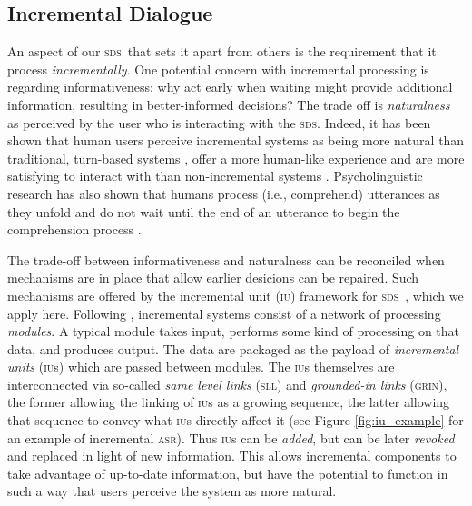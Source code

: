 \documentclass[11pt]{article}
\newcommand{\sds}[0]{\textsc{sds}}
\newcommand{\asr}[0]{\textsc{asr}}
\newcommand{\iu}[0]{\textsc{iu}}
\begin{document}
\subsection{Incremental Dialogue}

An aspect of our \sds\ that sets it apart from others is the requirement that it process \emph{incrementally}. One potential concern with incremental processing is regarding informativeness: why act early when waiting might provide additional information, resulting in better-informed decisions? 
The trade off is \emph{naturalness} as perceived by the user who is interacting with the \sds. Indeed, it has been shown that human users perceive incremental systems as being more natural than traditional, turn-based systems \cite{Aist2006,Skantze2009,skantze2010sigdial,Asri2014}, offer a more human-like experience  \cite{Edlund2008b} and are more satisfying to interact with than non-incremental systems \cite{Aistetal:incrunder-short}. Psycholinguistic research has also shown that humans process (i.e., comprehend) utterances as they unfold and do not wait until the end of an utterance to begin the comprehension process \cite{Tanenhaus1995,Spivey_2002tw}. 

The trade-off between informativeness and naturalness can be reconciled when mechanisms are in place that allow earlier desicions can be repaired. Such mechanisms are offered by the incremental unit (\iu) framework for \sds\ \cite{Schlangen2011}, which we apply here. Following , incremental systems consist of a network of processing \emph{modules}. A typical module takes input, performs some kind of processing on that data, and produces output. The data are packaged as the payload of \emph{incremental units} (\textsc{iu}s) which are passed between modules. The \textsc{iu}s themselves are interconnected via so-called \emph{same level links} (\textsc{sll}) and \emph{grounded-in links} (\textsc{grin}), the former allowing the linking of \textsc{iu}s as a growing sequence, the latter allowing that sequence to convey what \textsc{iu}s directly affect it (see Figure \ref{fig:iu_example} for an example of incremental \asr). Thus \iu s can be \emph{added}, but can be later \emph{revoked} and replaced in light of new information. This allows incremental components to take advantage of up-to-date information, but have the potential to function in such a way that users perceive the system as more natural.
\end{document}
